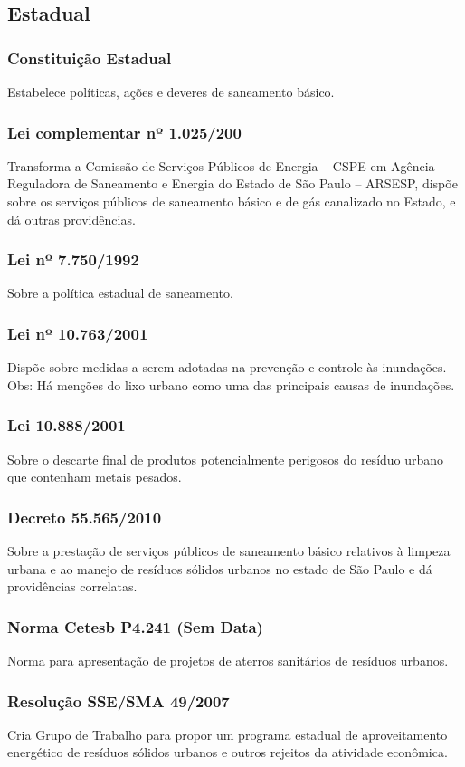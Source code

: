 \begin{subapend}
	\subsection{Estadual}
	\begin{subsubapend}
		\item \subsubsection{Constituição Estadual}
			Estabelece políticas, ações e deveres de saneamento básico.
		 \subsubsection{Lei complementar nº 1.025/200}
			Transforma a Comissão de Serviços Públicos de Energia – CSPE em Agência Reguladora de Saneamento e Energia do Estado de São Paulo – ARSESP, dispõe sobre os serviços públicos de saneamento básico e de gás canalizado no Estado, e dá outras providências.
		 \subsubsection{Lei nº 7.750/1992}
			Sobre a política estadual de saneamento.
		 \subsubsection{Lei nº 10.763/2001}
			Dispõe sobre medidas a serem adotadas na prevenção e controle às inundações. Obs: Há menções do lixo urbano como uma das principais causas de inundações.
		 \subsubsection{Lei 10.888/2001}
			Sobre o descarte final de produtos potencialmente perigosos do resíduo urbano que contenham metais pesados.
		 \subsubsection{Decreto 55.565/2010}
			Sobre a prestação de serviços públicos de saneamento básico relativos à limpeza urbana e ao manejo de resíduos sólidos urbanos no estado de São Paulo e dá providências correlatas.
		 \subsubsection{Norma Cetesb P4.241 (Sem Data)}
			Norma para apresentação de projetos de aterros sanitários de resíduos urbanos.
		 \subsubsection{Resolução SSE/SMA 49/2007}
			Cria Grupo de Trabalho para propor um programa estadual de aproveitamento energético de resíduos sólidos urbanos e outros rejeitos da atividade econômica.
	\end{subsubapend}
\end{subapend}

